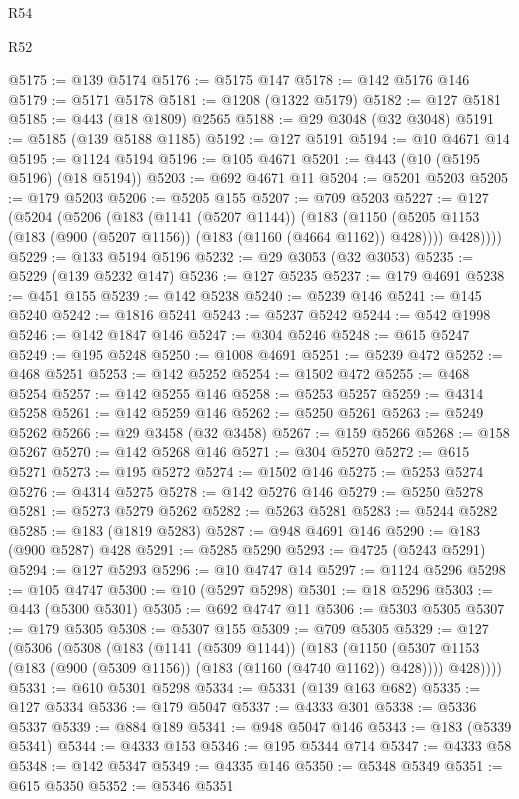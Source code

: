 \begin{lexlean}{R54}
\begin{lexlean}{R52}
\begin{coremodule}
{{{{{{{{{{{{{{{{{{{{{{{{{{{{{{{{{{{{{{{{{{{{{{{{{{{{{{{{{{{{{{{{{{{{{{{{{{{{{{{{{{{{{{{{{{{{{{{{{{{{{{{{{{{{{{{{{{{{{{{{{{{{{{{{{{{{{{{{{{{{{{{{{{{{{{{{{{{{{{{{{{{{{{{{{{{{{{{{{{{{{{{{{{{{{{{{{{{{{{@5175 := @139 @5174
@5176 := @5175 @147
@5178 := @142 @5176 @146
@5179 := @5171 @5178
@5181 := @1208 (@1322 @5179)
@5182 := @127 @5181
@5185 := @443 (@18 @1809) @2565
@5188 := @29 @3048 (@32 @3048)
@5191 := @5185 (@139 @5188 @1185)
@5192 := @127 @5191
@5194 := @10 @4671 @14
@5195 := @1124 @5194
@5196 := @105 @4671
@5201 := @443 (@10 (@5195 @5196) (@18 @5194))
@5203 := @692 @4671 @11
@5204 := @5201 @5203
@5205 := @179 @5203
@5206 := @5205 @155
@5207 := @709 @5203
@5227 := @127
    (@5204
      (@5206
        (@183
          (@1141 (@5207 @1144))
          (@183
            (@1150 (@5205 @1153 (@183 (@900 (@5207 @1156)) (@183 (@1160 (@4664 @1162)) @428))))
            @428))))
@5229 := @133 @5194 @5196
@5232 := @29 @3053 (@32 @3053)
@5235 := @5229 (@139 @5232 @147)
@5236 := @127 @5235
@5237 := @179 @4691
@5238 := @451 @155
@5239 := @142 @5238
@5240 := @5239 @146
@5241 := @145 @5240
@5242 := @1816 @5241
@5243 := @5237 @5242
@5244 := @542 @1998
@5246 := @142 @1847 @146
@5247 := @304 @5246
@5248 := @615 @5247
@5249 := @195 @5248
@5250 := @1008 @4691
@5251 := @5239 @472
@5252 := @468 @5251
@5253 := @142 @5252
@5254 := @1502 @472
@5255 := @468 @5254
@5257 := @142 @5255 @146
@5258 := @5253 @5257
@5259 := @4314 @5258
@5261 := @142 @5259 @146
@5262 := @5250 @5261
@5263 := @5249 @5262
@5266 := @29 @3458 (@32 @3458)
@5267 := @159 @5266
@5268 := @158 @5267
@5270 := @142 @5268 @146
@5271 := @304 @5270
@5272 := @615 @5271
@5273 := @195 @5272
@5274 := @1502 @146
@5275 := @5253 @5274
@5276 := @4314 @5275
@5278 := @142 @5276 @146
@5279 := @5250 @5278
@5281 := @5273 @5279 @5262
@5282 := @5263 @5281
@5283 := @5244 @5282
@5285 := @183 (@1819 @5283)
@5287 := @948 @4691 @146
@5290 := @183 (@900 @5287) @428
@5291 := @5285 @5290
@5293 := @4725 (@5243 @5291)
@5294 := @127 @5293
@5296 := @10 @4747 @14
@5297 := @1124 @5296
@5298 := @105 @4747
@5300 := @10 (@5297 @5298)
@5301 := @18 @5296
@5303 := @443 (@5300 @5301)
@5305 := @692 @4747 @11
@5306 := @5303 @5305
@5307 := @179 @5305
@5308 := @5307 @155
@5309 := @709 @5305
@5329 := @127
    (@5306
      (@5308
        (@183
          (@1141 (@5309 @1144))
          (@183
            (@1150 (@5307 @1153 (@183 (@900 (@5309 @1156)) (@183 (@1160 (@4740 @1162)) @428))))
            @428))))
@5331 := @610 @5301 @5298
@5334 := @5331 (@139 @163 @682)
@5335 := @127 @5334
@5336 := @179 @5047
@5337 := @4333 @301
@5338 := @5336 @5337
@5339 := @884 @189
@5341 := @948 @5047 @146
@5343 := @183 (@5339 @5341)
@5344 := @4333 @153
@5346 := @195 @5344 @714
@5347 := @4333 @58
@5348 := @142 @5347
@5349 := @4335 @146
@5350 := @5348 @5349
@5351 := @615 @5350
@5352 := @5346 @5351
}}}}}}}}}}}}}}}}}}}}}}}}}}}}}}}}}}}}}}}}}}}}}}}}}}}}}}}}}}}}}}}}}}}}}}}}}}}}}}}}}}}}}}}}}}}}}}}}}}}}}}}}}}}}}}}}}}}}}}}}}}}}}}}}}}}}}}}}}}}}}}}}}}}}}}}}}}}}}}}}}}}}}}}}}}}}}}}}}}}}}}}}}}}}}}}}}}}}}}
\end{coremodule}
\end{lexlean}
\end{lexlean}
